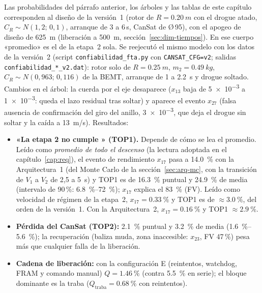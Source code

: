 \begin{nota}
Las probabilidades del párrafo anterior, los árboles y las tablas de este capítulo corresponden al diseño de la
versión~1 (rotor de $R=\SI{0.20}{m}$ con el drogue atado, $C_R\sim N(1{,}2;\,0{,}1)$, arranque de 3 a 6\,s,
CanSat de Ø\,95), con el apogeo de diseño de \SI{625}{m} (liberación a \SI{500}{m}, sección~\ref{sec:dim-tiempos}). En ese cuerpo
«promedio» es el de la etapa~2 sola. Se reejecutó el mismo modelo con los
datos de la versión~2 (script \texttt{confiabilidad\_fta.py} con \texttt{CANSAT\_CFG=v2}; salidas
\texttt{confiabilidad\_*\_v2.dat}): rotor solo de $R=\SI{0.25}{m}$,
$m_2=\SI{0.49}{kg}$, $C_R\sim N(0{,}963;\,0{,}116)$ de la BEMT, arranque de 1 a \SI{2.2}{s} y drogue soltado. Cambios en el
árbol: la cuerda por el eje desaparece ($x_{13}$ baja de \num{5e-3} a \num{1e-3}: queda el lazo residual tras soltar) y aparece el evento $x_{27}$
(falsa ausencia de confirmación del giro del anillo, \num{3e-3}, que deja el drogue sin soltar y la caída a \SI{13}{m/s}). Resultados:
\begin{itemize}[leftmargin=*,nosep]
  \item \textbf{«La etapa 2 no cumple » (TOP1).} Depende de cómo se lea el promedio. Leído como
        \emph{promedio de todo el descenso} (la lectura adoptada en el capítulo~\ref{cap:req}), el evento de
        rendimiento $x_{17}$ pasa a \SI{14.0}{\percent} con la Arquitectura~1 (del Monte Carlo de la
        sección~\ref{sec:arq-mc}, con la transición de $V_1$ a $V_2$ de 2,5 a \SI{5}{s}) y TOP1 es de \SI{16.3}{\percent} puntual
        y \SI{24.9}{\percent} de media (intervalo de 90\,\%: \SIrange{6.8}{72}{\percent}); $x_{17}$ explica el \SI{83}{\percent}
        (FV). Leído como velocidad de régimen de la etapa~2, $x_{17}=\SI{0.33}{\percent}$ y TOP1 es de
        $\approx\SI{3.0}{\percent}$, del orden de la versión~1. Con la Arquitectura~2, $x_{17}=\SI{0.16}{\percent}$ y TOP1
        $\approx\SI{2.9}{\percent}$.
  \item \textbf{Pérdida del CanSat (TOP2):} \SI{2.1}{\percent} puntual y \SI{3.2}{\percent} de media (\SIrange{1.6}{5.6}{\percent}); la
        recuperación (baliza muda, zona inaccesible: $x_{23}$, FV 47\,\%) pesa más que cualquier falla de la liberación.
  \item \textbf{Cadena de liberación:} con la configuración E (reintentos, watchdog, FRAM y comando manual)
        $Q=\SI{1.46}{\percent}$ (contra \SI{5.5}{\percent} en serie); el bloque dominante es la traba ($Q_{\text{traba}}=\SI{0.68}{\percent}$ con reintentos).

\end{itemize}
\end{nota}
